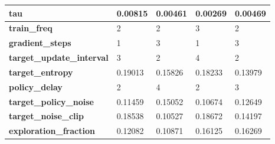 \documentclass[../xlapes02]{subfiles}
\begin{document}
\begin{table}[!ht]
{\begin{tabular}{|l||l|l||l|l|}
                \textbf{tau}                       & 0.00815                                      & 0.00461                                      & 0.00269                                      & 0.00469                                      \\ \hline
                \textbf{train\_freq}               & 2                                            & 2                                            & 3                                            & 2                                            \\ \hline
                \textbf{gradient\_steps}           & 1                                            & 3                                            & 1                                            & 3                                            \\ \hline
                \textbf{target\_update\_interval}  & 3                                            & 2                                            & 4                                            & 2                                            \\ \hline
                \textbf{target\_entropy}           & 0.19013                                      & 0.15826                                      & 0.18233                                      & 0.13979                                      \\ \hline
                \textbf{policy\_delay}             & 2                                            & 4                                            & 2                                            & 3                                            \\ \hline
                \textbf{target\_policy\_noise}     & 0.11459                                      & 0.15052                                      & 0.10674                                      & 0.12649                                      \\ \hline
                \textbf{target\_noise\_clip}       & 0.18538                                      & 0.10527                                      & 0.18672                                      & 0.14197                                      \\ \hline
                \textbf{exploration\_fraction}     & 0.12082                                      & 0.10871                                      & 0.16125                                      & 0.16269                                      \\ \hline

\end{tabular}}
\end{table}
\end{document}
